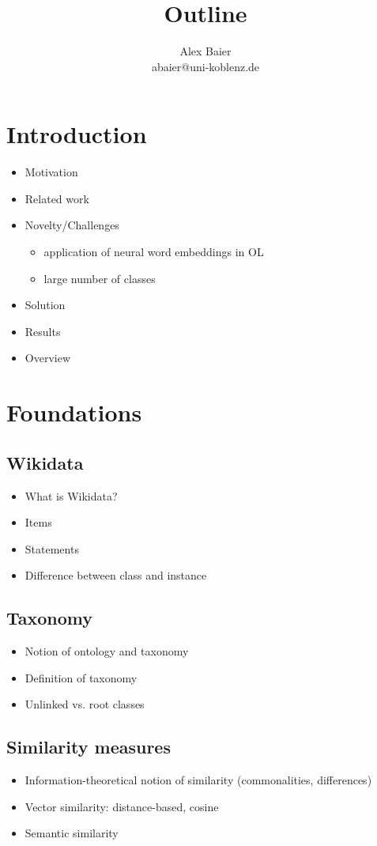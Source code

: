 \documentclass{scrartcl} %
\title{Outline}
\author{Alex Baier \\ abaier@uni-koblenz.de}
\begin{document}
\maketitle

\section{Introduction}
\begin{itemize}
\item Motivation
\item Related work
\item Novelty/Challenges
\begin{itemize}
\item application of neural word embeddings in OL
\item large number of classes
\end{itemize}
\item Solution
\item Results
\item Overview
\end{itemize}

\section{Foundations}

\subsection{Wikidata}
\begin{itemize}
\item What is Wikidata?
\item Items
\item Statements
\item Difference between class and instance
\end{itemize}

\subsection{Taxonomy}
\begin{itemize}
\item Notion of ontology and taxonomy
\item Definition of taxonomy
\item Unlinked vs. root classes
\end{itemize}

\subsection{Similarity measures}
\begin{itemize}
\item Information-theoretical notion of similarity (commonalities, differences)
\item Vector similarity: distance-based, cosine
\item Semantic similarity
\end{itemize}
\end{document}
